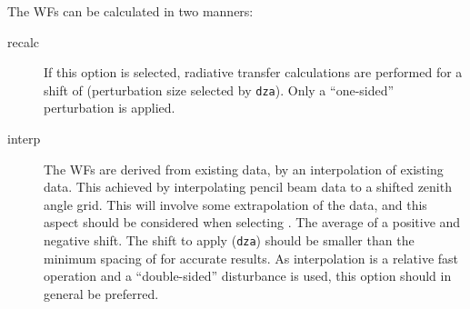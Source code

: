 The WFs can be calculated in two manners:
\begin{description}
\item[recalc] If this option is selected, radiative transfer calculations are
  performed for a shift of  (perturbation size selected
  by \verb|dza|). Only a ``one-sided'' perturbation is applied.
\item[interp] The WFs are derived from existing data, by an interpolation of
  existing data. This achieved by interpolating pencil beam data to a shifted
  zenith angle grid. This will involve some extrapolation of the data, and this
  aspect should be considered when selecting . The
  average of a positive and negative shift. The shift to apply (\verb|dza|)
  should be smaller than the minimum spacing of 
  for accurate results. As interpolation is a relative fast operation and a
  ``double-sided'' disturbance is used, this option should in general be
  preferred.
\end{description}

